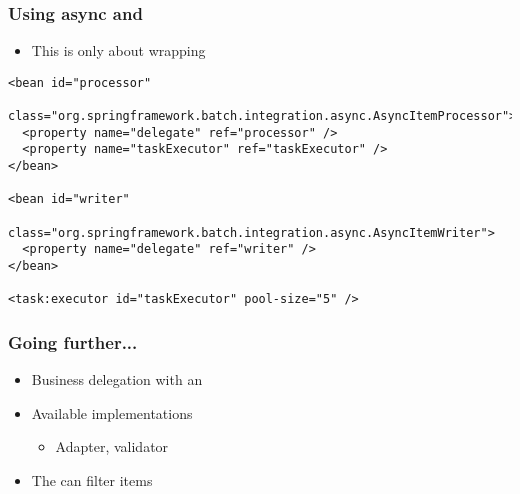 \begin{frame}[fragile]
\frametitle{Using async  and }
\begin{itemize}
  \item This is only about wrapping  
 \end{itemize}
\lstset{language=XML}
\begin{lstlisting}
<bean id="processor"
      class="org.springframework.batch.integration.async.AsyncItemProcessor">
  <property name="delegate" ref="processor" />
  <property name="taskExecutor" ref="taskExecutor" />
</bean>

<bean id="writer"
      class="org.springframework.batch.integration.async.AsyncItemWriter">
  <property name="delegate" ref="writer" />							
</bean>

<task:executor id="taskExecutor" pool-size="5" />
\end{lstlisting}
\end{frame}

\begin{frame}
 \frametitle{Going further...}
 \begin{itemize}
  \item Business delegation with an 
  \item Available  implementations
  \begin{itemize}
    \item Adapter, validator
  \end{itemize}
  \item The  can filter items
 \end{itemize}
\end{frame}

